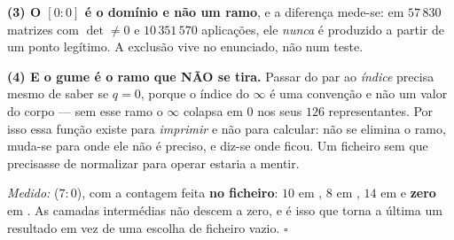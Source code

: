 \documentclass[livro.tex]{subfiles}
\begin{document}
\begin{teorema}
\textbf{(3) O $[0{:}0]$ é o domínio e não um ramo}, e a diferença
mede-se: em $57\,830$ matrizes com $\det\neq0$ e $10\,351\,570$
aplicações, ele \emph{nunca} é produzido a partir de um ponto legítimo.
A exclusão vive no enunciado, não num teste.

\textbf{(4) E o gume é o ramo que NÃO se tira.} Passar do par ao
\emph{índice} precisa mesmo de saber se $q=0$, porque o índice do
$\infty$ é uma convenção e não um valor do corpo --- sem esse ramo o
$\infty$ colapsa em $0$ nos seus $126$ representantes. Por isso essa
função existe para \emph{imprimir} e não para calcular: não se elimina o
ramo, muda-se para onde ele não é preciso, e diz-se onde ficou. Um
ficheiro sem  que precisasse de normalizar para operar estaria a
mentir.

\emph{Medido:}  ($7{:}0$), com a contagem feita
\textbf{no ficheiro}: $10$ em , $8$ em
, $14$ em  e \textbf{zero} em
. As camadas intermédias não descem a zero, e é isso
que torna a última um resultado em vez de uma escolha de ficheiro vazio.
$\square$
\end{teorema}
\end{document}
